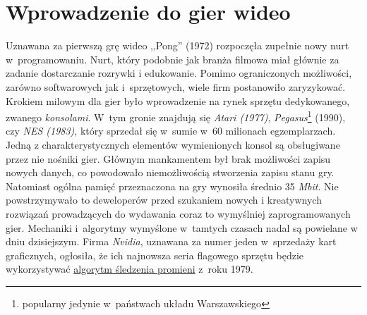 \documentclass[brudnopis]{xmgr}
\begin{document}
\chapter{Wprowadzenie do gier wideo}
Uznawana za pierwszą grę wideo ,,Pong'' (1972) rozpoczęła zupełnie
nowy nurt w~programowaniu. Nurt, który podobnie jak branża filmowa miał głównie za zadanie dostarczanie rozrywki i edukowanie. Pomimo ograniczonych możliwości, zarówno softwarowych jak i~sprzętowych, wiele firm postanowiło zaryzykować.
Krokiem milowym dla gier było wprowadzenie na rynek sprzętu dedykowanego, zwanego {\em konsolami}. W~tym gronie znajdują się {\em Atari (1977)}, {\em Pegasus}\footnote{popularny jedynie w~państwach układu
Warszawskiego} (1990), czy {\em NES (1983)}, który sprzedał się w~sumie w~60
milionach egzemplarzach. Jedną z charakterystycznych elementów wymienionych konsol są obsługiwane przez nie nośniki gier. Głównym mankamentem był brak możliwości zapisu nowych danych, co powodowało niemożliwością stworzenia zapisu stanu gry. Natomiast ogólna pamięć przeznaczona na gry wynosiła średnio 35 {\em Mbit}. Nie powstrzymywało to deweloperów przed
szukaniem nowych i kreatywnych rozwiązań prowadzących do wydawania coraz to wymyślniej zaprogramowanych gier.
Mechaniki i~algorytmy wymyślone w~tamtych czasach nadal są powielane w dniu dzisiejszym. Firma {\em Nvidia}, uznawana za numer jeden w~sprzedaży kart graficznych, ogłosiła, że ich najnowsza seria flagowego sprzętu będzie wykorzystywać \hyperref[slownik]{algorytm śledzenia promieni} z~roku 1979.
\end{document}
